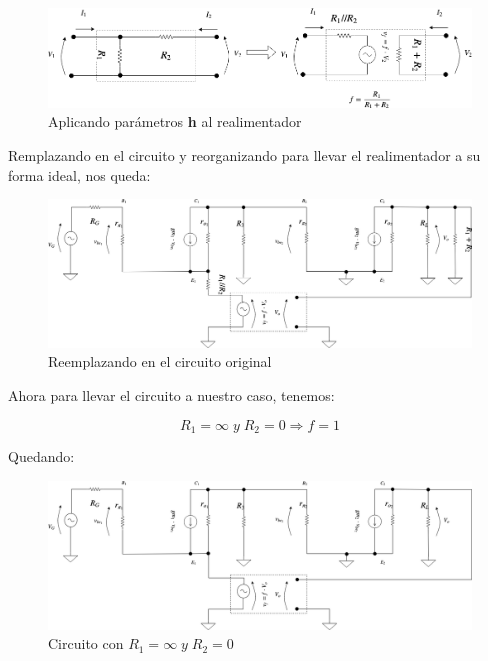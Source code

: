 \begin{figure}[H] %
\begin{center}
\includegraphics[width=0.9 \textwidth, angle=0]{./img/sziklai/sziklai3.png}
\caption{\label{fig:fig_sziklai_cir_3}\footnotesize{Aplicando parámetros \textbf{h} al realimentador}}
\end{center}
\end{figure}



Remplazando en el circuito y reorganizando para llevar el realimentador a su forma ideal, nos queda:


\begin{figure}[H] %
\begin{center}
\includegraphics[width=0.9 \textwidth, angle=0]{./img/sziklai/sziklai4.png}
\caption{\label{fig:fig_sziklai_cir_4}\footnotesize{Reemplazando en el circuito original}}
\end{center}
\end{figure}

\vfill

\clearpage


Ahora para llevar el circuito a nuestro caso, tenemos:

\begin{equation*}
R_{1} = \infty \; y \; R_{2} = 0 \Rightarrow f = 1
\end{equation*}

Quedando:

\begin{figure}[H] %
\begin{center}
\includegraphics[width=0.9 \textwidth, angle=0]{./img/sziklai/sziklai5.png}
\caption{\label{fig:fig_sziklai_cir_5}\footnotesize{Circuito con $R_{1} = \infty \; y \; R_{2} = 0$}}
\end{center}
\end{figure}


